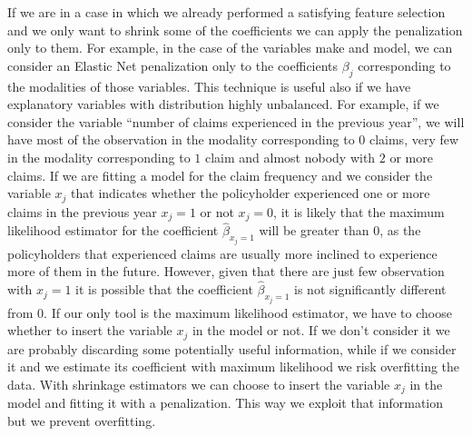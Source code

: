 \documentclass[a4paper, twoside, openright, 12pt]{report}
\theoremstyle{definition}
\theoremstyle{definition}
\theoremstyle{definition}
\theoremstyle{remark}
\begin{document}
If we are in a case in which we already performed a satisfying feature selection and we only want to shrink some of the coefficients we can apply the penalization only to them. For example, in the case of the variables make and model, we can consider an Elastic Net penalization only to the coefficients \(\beta_j\) corresponding to the modalities of those variables. This technique is useful also if we have explanatory variables with distribution highly unbalanced. For example, if we consider the variable ``number of claims experienced in the previous year'', we will have most of the observation in the modality corresponding to \(0\) claims, very few in the modality corresponding to \(1\) claim and almost nobody with \(2\) or more claims. If we are fitting a model for the claim frequency and we consider the variable \(x_j\) that indicates whether the policyholder experienced one or more claims in the previous year \(x_j=1\) or not \(x_j=0\), it is likely that the maximum likelihood estimator for the coefficient \(\hat{\beta}_{x_j=1}\) will be greater than \(0\), as the policyholders that experienced claims are usually more inclined to experience more of them in the future. However, given that there are just few observation with \(x_j=1\) it is possible that the coefficient \(\hat{\beta}_{x_j=1}\) is not significantly different from \(0\). If our only tool is the maximum likelihood estimator, we have to choose whether to insert the variable \(x_j\) in the model or not. If we don't consider it we are probably discarding some potentially useful information, while if we consider it and we estimate its coefficient with maximum likelihood we risk overfitting the data. With shrinkage estimators we can choose to insert the variable \(x_j\) in the model and fitting it with a penalization. This way we exploit that information but we prevent overfitting.
\end{document}
